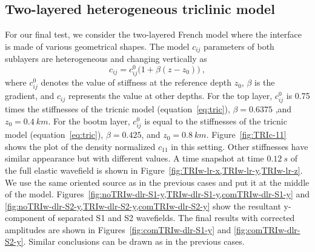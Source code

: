 \subsection{Two-layered heterogeneous triclinic model}
For our final test, we consider the two-layered French model \cite[]{french} where the interface is made of various geometrical shapes. The model $c_{ij}$ parameters of both sublayers are heterogeneous and changing vertically as
\begin{equation}
\label{eq:hetlaw}
c_{ij} = c^0_{ij}\bigg(1+\beta(z-z_0)\bigg)~,
\end{equation}
where $c^0_{ij}$ denotes the value of stiffness at the reference depth $z_0$, $\beta$ is the gradient, and $c_{ij}$ represents the value at other depths. For the top layer, $c^0_{ij}$ is 0.75 times the stiffnesses of the tricnic model (equation~\ref{eq:tric}), $\beta = 0.6375$ ,and $z_0 = 0.4~km$.  For the bootm layer, $c^0_{ij}$ is equal to the stiffnesses of the tricnic model (equation~\ref{eq:tric}), $\beta = 0.425$, and $z_0 = 0.8~km$. Figure~\ref{fig:TRIc-11} shows the plot of the density normalized $c_{11}$ in this setting. Other stiffnesses have similar appearance but with different values. A time snapshot at time $0.12~s$ of the full elastic wavefield is shown in Figure~\ref{fig:TRIw-lr-x,TRIw-lr-y,TRIw-lr-z}. We use the same oriented source as in the previous cases and put it at the middle of the model.
Figures~\ref{fig:noTRIw-dlr-S1-y,TRIw-dlr-S1-y,comTRIw-dlr-S1-y} and \ref{fig:noTRIw-dlr-S2-y,TRIw-dlr-S2-y,comTRIw-dlr-S2-y} show the resultant y-component of separated S1 and S2 wavefields. The final results with corrected amplitudes are shown in Figures~\ref{fig:comTRIw-dlr-S1-y} and \ref{fig:comTRIw-dlr-S2-y}. Similar conclusions can be drawn as in the previous cases.



